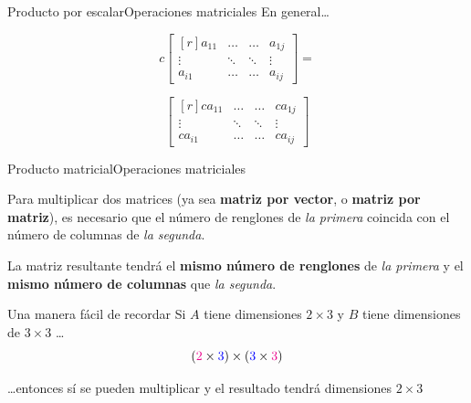 \documentclass[spanish, c]{beamer}
\begin{document}
\begin{frame}{Producto por escalar}{Operaciones matriciales}
    En general\dots

    \[%
        c
        \begin{bmatrix*}[r]
            a_{11} & \dots & \dots & a_{1j} \\
            \vdots & \ddots & \ddots & \vdots \\
            a_{i1} & \dots & \dots & a_{ij}
        \end{bmatrix*} =
    \]

    \bigskip

    \[%
        \begin{bmatrix*}[r]
            ca_{11} & \dots & \dots & ca_{1j} \\
            \vdots & \ddots & \ddots & \vdots \\
            ca_{i1} & \dots & \dots & ca_{ij}
        \end{bmatrix*}
    \]
    
\end{frame}

\begin{frame}{Producto matricial}{Operaciones matriciales}

    Para multiplicar dos matrices (ya sea \textbf{matriz por vector}, o \textbf{matriz por matriz}), es necesario que el \alert{número de renglones} de \textit{la primera} \alert{coincida} con el \alert{número de columnas} de \textit{la segunda}. \pause
    
    \bigskip
    
    La matriz resultante tendrá el \textbf{mismo número de renglones} de \textit{la primera} y el \textbf{mismo número de columnas} que \textit{la segunda}. \pause

    \bigskip

    \begin{exampleblock}{Una manera fácil de recordar}
        Si $A$ tiene dimensiones $2 \times 3$ y $B$ tiene dimensiones de $3 \times 3$ \dots
        \[({\color{magenta} 2} \times {\color{blue} 3}) \times ({\color{blue} 3} \times {\color{magenta} 3})\]

        \dots entonces {\color{blue} sí se pueden multiplicar} y el resultado tendrá {\color{magenta} dimensiones $2 \times 3$}
    \end{exampleblock}

\end{frame}
\end{document}
